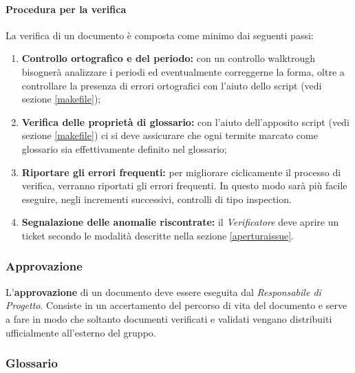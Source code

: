 	\paragraph{Procedura per la verifica}
	La verifica di un documento è composta come minimo dai seguenti passi:
	\begin{enumerate}
		\item \textbf{Controllo ortografico e del periodo:} con un controllo walktrough bisognerà analizzare i periodi ed eventualmente correggerne la forma, oltre a controllare la presenza di errori ortografici con l'aiuto dello script  (vedi sezione \ref{makefile});
		\item \textbf{Verifica delle proprietà di glossario:} con l'aiuto dell'apposito script  (vedi sezione \ref{makefile}) ci si deve assicurare che ogni termite marcato come glossario sia effettivamente definito nel glossario; 
		\item \textbf{Riportare gli errori frequenti:} per migliorare ciclicamente il processo di verifica, verranno riportati gli errori frequenti. In questo modo sarà più facile eseguire, negli incrementi successivi, controlli di tipo inspection.
		\item \textbf{Segnalazione delle anomalie riscontrate:} il \emph{Verificatore} deve aprire un ticket secondo le modalità descritte nella sezione \ref{aperturaissue}.
	\end{enumerate}

\subsubsection{Approvazione}

L'\textbf{approvazione} di un documento deve essere eseguita dal \textit{Responsabile di Progetto}. Consiste in un accertamento del percorso di vita del documento e serve a fare in modo che soltanto documenti verificati e validati vengano distribuiti ufficialmente all'esterno del gruppo.

\subsubsection{Glossario}

